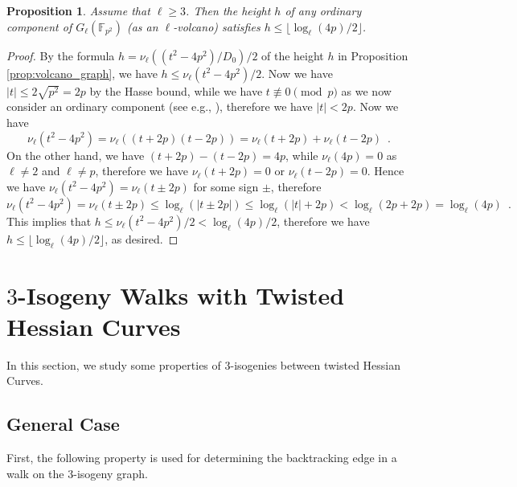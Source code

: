 \documentclass{article}
\newtheorem{proposition}[theorem]{Proposition}
\theoremstyle{definition}
\newcommand{\FF}{\mathbb{F}}
\begin{document}
\begin{proposition}
\label{prop:bound_for_height}
Assume that $\ell \geq 3$.
Then the height $h$ of any ordinary component of $G_{\ell}(\FF_{p^2})$ (as an $\ell$-volcano) satisfies $h \leq \lfloor \log_{\ell}(4p) / 2 \rfloor$.
\end{proposition}
\begin{proof}
By the formula $h = \nu_{\ell}((t^2 - 4p^2) / D_0) / 2$ of the height $h$ in Proposition \ref{prop:volcano_graph}, we have $h \leq \nu_{\ell}(t^2 - 4p^2) / 2$.
Now we have $|t| \leq 2 \sqrt{p^2} = 2p$ by the Hasse bound, while we have $t \not\equiv 0 \pmod{p}$ as we now consider an ordinary component (see e.g., \cite[Proof of Theorem V.4.1]{Silverman:AEC}), therefore we have $|t| < 2p$.
Now we have
\[
\nu_{\ell}(t^2 - 4p^2)
= \nu_{\ell}((t + 2p)(t - 2p))
= \nu_{\ell}(t + 2p) + \nu_{\ell}(t - 2p) \enspace.
\]
On the other hand, we have $(t + 2p) - (t - 2p) = 4p$, while $\nu_{\ell}(4p) = 0$ as $\ell \neq 2$ and $\ell \neq p$, therefore we have $\nu_{\ell}(t + 2p) = 0$ or $\nu_{\ell}(t - 2p) = 0$.
Hence we have $\nu_{\ell}(t^2 - 4p^2) = \nu_{\ell}(t \pm 2p)$ for some sign $\pm$, therefore
\[
\nu_{\ell}(t^2 - 4p^2)
= \nu_{\ell}(t \pm 2p)
\leq \log_{\ell}(|t \pm 2p|)
\leq \log_{\ell}(|t| + 2p)
< \log_{\ell}(2p + 2p)
= \log_{\ell}(4p) \enspace.
\]
This implies that $h \leq \nu_{\ell}(t^2 - 4p^2) / 2 < \log_{\ell}(4p) / 2$, therefore we have $h \leq \lfloor \log_{\ell}(4p) / 2 \rfloor$, as desired.
\end{proof}


\section{$3$-Isogeny Walks with Twisted Hessian Curves}
\label{sec:3-isogeny_walk}

In this section, we study some properties of $3$-isogenies between twisted Hessian Curves.


\subsection{General Case}
\label{sec:3-isogeny_walk:general}

First, the following property is used for determining the backtracking edge in a walk on the $3$-isogeny graph.
\end{document}
